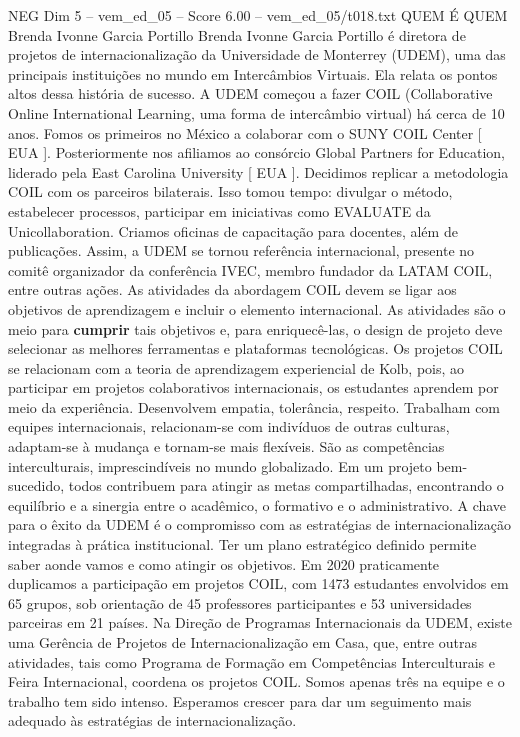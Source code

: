 \begin{textsample}{NEG Dim 5 – vem\_ed\_05 – Score 6.00 – vem\_ed\_05/t018.txt}  \label{ex:f5_neg_103}
QUEM É QUEM Brenda Ivonne Garcia Portillo Brenda Ivonne Garcia Portillo é diretora de projetos de internacionalização da Universidade de Monterrey (UDEM), uma das principais instituições no mundo em Intercâmbios Virtuais.
Ela relata os pontos altos dessa história de sucesso.
A UDEM começou a fazer COIL (Collaborative Online International Learning, uma forma de intercâmbio virtual) há cerca de 10 anos.
Fomos os primeiros no México a colaborar com o SUNY COIL Center [ EUA ].
Posteriormente nos afiliamos ao consórcio Global Partners for Education, liderado pela East Carolina University [ EUA ].
Decidimos replicar a metodologia COIL com os parceiros bilaterais.
Isso tomou tempo: divulgar o método, estabelecer processos, participar em iniciativas como EVALUATE da Unicollaboration.
Criamos oficinas de capacitação para docentes, além de publicações.
Assim, a UDEM se tornou referência internacional, presente no comitê organizador da conferência IVEC, membro fundador da LATAM COIL, entre outras ações.
As atividades da abordagem COIL devem se ligar aos objetivos de aprendizagem e incluir o elemento internacional.
As atividades são o meio para \textbf{cumprir} tais objetivos e, para enriquecê-las, o design de projeto deve selecionar as melhores ferramentas e plataformas tecnológicas.
Os projetos COIL se relacionam com a teoria de aprendizagem experiencial de Kolb, pois, ao participar em projetos colaborativos internacionais, os estudantes aprendem por meio da experiência.
Desenvolvem empatia, tolerância, respeito.
Trabalham com equipes internacionais, relacionam-se com indivíduos de outras culturas, adaptam-se à mudança e tornam-se mais flexíveis.
São as competências interculturais, imprescindíveis no mundo globalizado.
Em um projeto bem-sucedido, todos contribuem para atingir as metas compartilhadas, encontrando o equilíbrio e a sinergia entre o acadêmico, o formativo e o administrativo.
A chave para o êxito da UDEM é o compromisso com as estratégias de internacionalização integradas à prática institucional.
Ter um plano estratégico definido permite saber aonde vamos e como atingir os objetivos.
Em 2020 praticamente duplicamos a participação em projetos COIL, com 1473 estudantes envolvidos em 65 grupos, sob orientação de 45 professores participantes e 53 universidades parceiras em 21 países.
Na Direção de Programas Internacionais da UDEM, existe uma Gerência de Projetos de Internacionalização em Casa, que, entre outras atividades, tais como Programa de Formação em Competências Interculturais e Feira Internacional, coordena os projetos COIL.
Somos apenas três na equipe e o trabalho tem sido intenso.
Esperamos crescer para dar um seguimento mais adequado às estratégias de internacionalização.

\end{textsample}
